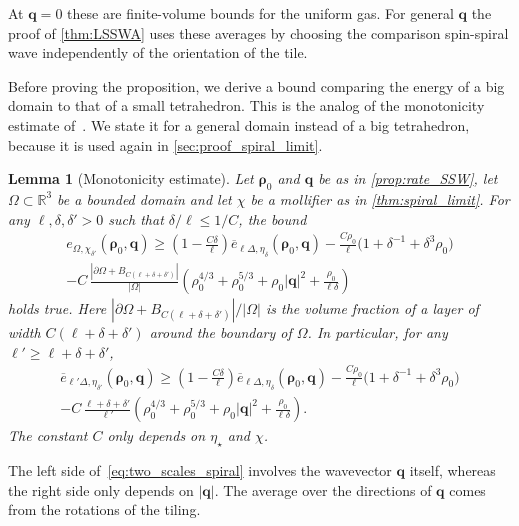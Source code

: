 \documentclass[final,reqno]{amsart}
\newtheorem{lemma}[theorem]{Lemma}
\theoremstyle{remark}
\renewcommand{\le}{\leqslant}
\renewcommand{\ge}{\geqslant}
\newcommand{\ol}[1]{\overline{#1}}
\newcommand{\RR}{\mathbb{R}}
\newcommand{\tetra}{\mathbb{\Delta}}
\begin{document}
At $\mathbf{q}=0$ these are finite-volume bounds for the uniform gas. For general $\mathbf{q}$ the proof of \cref{thm:LSSWA} uses these averages by choosing the comparison spin-spiral wave independently of the orientation of the tile.

Before proving the proposition, we derive a bound comparing the energy of a big domain to that of a small tetrahedron. This is the analog of the monotonicity estimate of~\cite[Lemma~5.11]{csirik2026non}. We state it for a general domain instead of a big tetrahedron, because it is used again in \cref{sec:proof_spiral_limit}.

\begin{lemma}[Monotonicity estimate]\label{lem:monotonicity_spiral}
Let $\bm{\rho}_0$ and $\mathbf{q}$ be as in \cref{prop:rate_SSW}, let $\Omega\subset\RR^3$ be a bounded domain and let $\chi$ be a mollifier as in \cref{thm:spiral_limit}. For any $\ell,\delta,\delta'>0$ such that $\delta/\ell\le1/C$, the bound
\begin{multline}\label{eq:two_scales_spiral}
 e_{\Omega,\chi_{\delta'}}(\bm{\rho}_0,\mathbf{q})
 \ge\left(1-\frac{C\delta}{\ell}\right)\ol e_{\ell\tetra,\eta_\delta}(\bm{\rho}_0,\mathbf{q})
 -\frac{C\rho_0}{\ell}\big(1+\delta^{-1}+\delta^3\rho_0\big)\\
 -C\,\frac{|\partial\Omega+B_{C(\ell+\delta+\delta')}|}{|\Omega|}\left(\rho_0^{4/3}+\rho_0^{5/3}+\rho_0|\mathbf{q}|^2+\frac{\rho_0}{\ell\delta}\right)
\end{multline}
holds true. Here $|\partial\Omega+B_{C(\ell+\delta+\delta')}|/|\Omega|$ is the volume fraction of a layer of width $C(\ell+\delta+\delta')$ around the boundary of $\Omega$. In particular, for any $\ell'\ge\ell+\delta+\delta'$,
\begin{multline}\label{eq:tetracomp_spiral}
 \ol e_{\ell'\tetra,\eta_{\delta'}}(\bm{\rho}_0,\mathbf{q})
 \ge\left(1-\frac{C\delta}{\ell}\right)\ol e_{\ell\tetra,\eta_\delta}(\bm{\rho}_0,\mathbf{q})
 -\frac{C\rho_0}{\ell}\big(1+\delta^{-1}+\delta^3\rho_0\big)\\
 -C\,\frac{\ell+\delta+\delta'}{\ell'}\left(\rho_0^{4/3}+\rho_0^{5/3}+\rho_0|\mathbf{q}|^2+\frac{\rho_0}{\ell\delta}\right).
\end{multline}
The constant $C$ only depends on $\eta_\star$ and $\chi$.
\end{lemma}

The left side of~\cref{eq:two_scales_spiral} involves the wavevector $\mathbf{q}$ itself, whereas the right side only depends on $|\mathbf{q}|$. The average over the directions of $\mathbf{q}$ comes from the rotations of the tiling.
\end{document}

